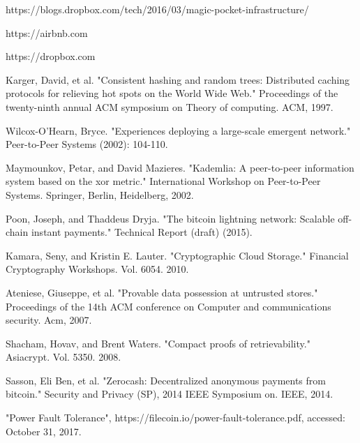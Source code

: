 \documentclass[conference]{IEEEtran}
\begin{document}
\begin{thebibliography}{1}
 https://blogs.dropbox.com/tech/2016/03/magic-pocket-infrastructure/

 https://airbnb.com

 https://dropbox.com

 Karger, David, et al. "Consistent hashing and random trees: Distributed caching protocols for relieving hot spots on the World Wide Web." Proceedings of the twenty-ninth annual ACM symposium on Theory of computing. ACM, 1997.

 Wilcox-O’Hearn, Bryce. "Experiences deploying a large-scale emergent network." Peer-to-Peer Systems (2002): 104-110.

 Maymounkov, Petar, and David Mazieres. "Kademlia: A peer-to-peer information system based on the xor metric." International Workshop on Peer-to-Peer Systems. Springer, Berlin, Heidelberg, 2002.

 Poon, Joseph, and Thaddeus Dryja. "The bitcoin lightning network: Scalable off-chain instant payments." Technical Report (draft) (2015).

 Kamara, Seny, and Kristin E. Lauter. "Cryptographic Cloud Storage." Financial Cryptography Workshops. Vol. 6054. 2010.

 Ateniese, Giuseppe, et al. "Provable data possession at untrusted stores." Proceedings of the 14th ACM conference on Computer and communications security. Acm, 2007.

 Shacham, Hovav, and Brent Waters. "Compact proofs of retrievability." Asiacrypt. Vol. 5350. 2008.

 Sasson, Eli Ben, et al. "Zerocash: Decentralized anonymous payments from bitcoin." Security and Privacy (SP), 2014 IEEE Symposium on. IEEE, 2014.

 "Power Fault Tolerance", https://filecoin.io/power-fault-tolerance.pdf, accessed: October 31, 2017.

\end{thebibliography}

% 
\end{document}
